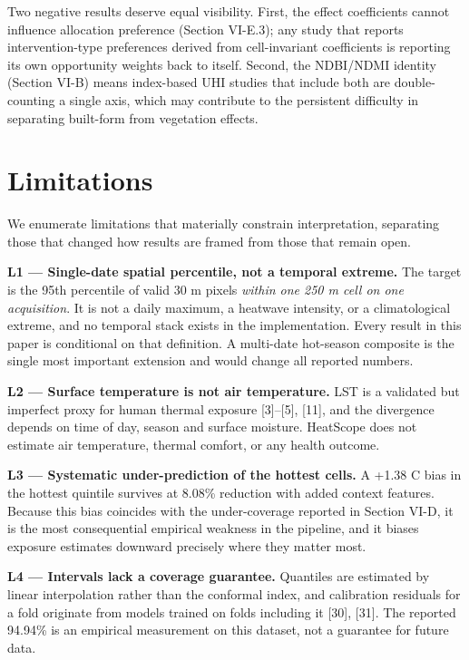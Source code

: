 Two negative results deserve equal visibility. First, the effect coefficients cannot influence
allocation preference (Section VI-E.3); any study that reports intervention-type preferences derived
from cell-invariant coefficients is reporting its own opportunity weights back to itself. Second,
the NDBI/NDMI identity (Section VI-B) means index-based UHI studies that include both are
double-counting a single axis, which may contribute to the persistent difficulty in separating
built-form from vegetation effects.

\section{Limitations}\label{viii.-limitations}

We enumerate limitations that materially constrain interpretation, separating those that changed how
results are framed from those that remain open.

\textbf{L1 --- Single-date spatial percentile, not a temporal extreme.} The target is the 95th percentile of
valid 30 m pixels \emph{within one 250 m cell on one acquisition}. It is not a daily maximum, a heatwave
intensity, or a climatological extreme, and no temporal stack exists in the implementation. Every
result in this paper is conditional on that definition. A multi-date hot-season composite is the single
most important extension and would change all reported numbers.

\textbf{L2 --- Surface temperature is not air temperature.} LST is a validated but imperfect proxy for human
thermal exposure {[}3{]}--{[}5{]}, {[}11{]}, and the divergence depends on time of day, season and surface
moisture. HeatScope does not estimate air temperature, thermal comfort, or any health outcome.

\textbf{L3 --- Systematic under-prediction of the hottest cells.} A +1.38 \textdegree{}C bias in the hottest quintile
survives at 8.08\% reduction with added context features. Because this bias coincides with the
under-coverage reported in Section VI-D, it is the most consequential empirical weakness in the
pipeline, and it biases exposure estimates downward precisely where they matter most.

\textbf{L4 --- Intervals lack a coverage guarantee.} Quantiles are estimated by linear interpolation rather
than the conformal index, and calibration residuals for a fold originate from models trained on folds
including it {[}30{]}, {[}31{]}. The reported 94.94\% is an empirical measurement on this dataset, not a
guarantee for future data.

